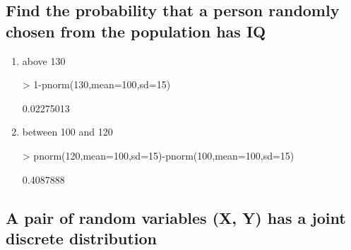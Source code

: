 \documentclass[a4paper]{article}
\begin{document}
\subsection{Find the probability that a person randomly chosen from the
population has IQ}

\begin{enumerate}[label=\emph{\alph*})]
\item  above 130
\begin{Schunk}
\begin{Sinput}
> 1-pnorm(130,mean=100,sd=15)	
\end{Sinput}
\begin{Soutput}
[1] 0.02275013
\end{Soutput}
\end{Schunk}
\item between 100 and 120
\begin{Schunk}
\begin{Sinput}
> pnorm(120,mean=100,sd=15)-pnorm(100,mean=100,sd=15)
\end{Sinput}
\begin{Soutput}
[1] 0.4087888
\end{Soutput}
\end{Schunk}
\end{enumerate}

\subsection{A pair of random variables (X, Y) has a joint discrete distribution}
\end{document}
